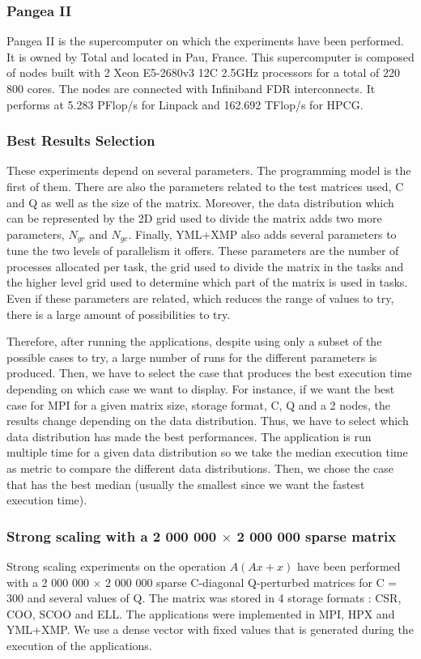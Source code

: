 \subsubsection{Pangea II}
Pangea II is the supercomputer on which the experiments have been performed.
It is owned by Total and located in Pau, France.
This supercomputer is composed of nodes built with 2 Xeon E5-2680v3 12C 2.5GHz processors for a total of 220 800 cores.
The nodes are connected with Infiniband FDR interconnects.
It performs at 5.283 PFlop/s for Linpack and 162.692 TFlop/s for HPCG.

\subsubsection{Best Results Selection}
These experiments depend on several parameters.
The programming model is the first of them.
There are also the parameters related to the test matrices used, C and Q as well as the size of the matrix.
Moreover, the data distribution which can be represented by the 2D grid used to divide the matrix adds two more parameters, $N_{gr}$ and $N_{gc}$.
Finally, YML+XMP also adds several parameters to tune the two levels of parallelism it offers.
These parameters are the number of processes allocated per task, the grid used to divide the matrix in the tasks and the higher level grid used to determine which part of the matrix is used in tasks.
Even if these parameters are related, which reduces the range of values to try, there is a large amount of possibilities to try.

Therefore, after running the applications, despite using only a subset of the possible cases to try, a large number of runs for the different parameters is produced.
Then, we have to select the case that produces the best execution time depending on which case we want to display.
For instance, if we want the best case for MPI for a given matrix size, storage format, C, Q and a 2 nodes, the results change depending on the data distribution.
Thus, we have to select which data distribution has made the best performances.
The application is run multiple time for a given data distribution so we take the median execution time as metric to compare the different data distributions.
Then, we chose the case that has the best median (usually the smallest since we want the fastest execution time).

\subsubsection{Strong scaling with a 2 000 000 $\times$ 2 000 000 sparse matrix}
Strong scaling experiments on the operation $A(Ax+x)$ have been performed with a 2 000 000 $\times$ 2 000 000 sparse C-diagonal Q-perturbed matrices for C = 300 and several values of Q.
The matrix was stored in 4 storage formats : CSR, COO, SCOO and ELL.
The applications were implemented in MPI, HPX and YML+XMP.
We use a dense vector with fixed values that is generated during the execution of the applications.

